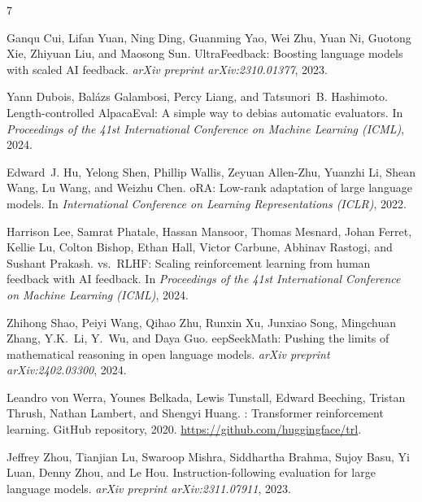 \documentclass{article}
\begin{document}
\begin{thebibliography}{7}

Ganqu Cui, Lifan Yuan, Ning Ding, Guanming Yao, Wei Zhu, Yuan Ni, Guotong Xie, Zhiyuan Liu, and Maosong Sun.
\newblock Ultra{F}eedback: Boosting language models with scaled {AI} feedback.
\newblock \emph{arXiv preprint arXiv:2310.01377}, 2023.

Yann Dubois, Bal\'{a}zs Galambosi, Percy Liang, and Tatsunori~B. Hashimoto.
\newblock Length-controlled {A}lpaca{E}val: A simple way to debias automatic evaluators.
\newblock In \emph{Proceedings of the 41st International Conference on Machine Learning (ICML)}, 2024.

Edward~J. Hu, Yelong Shen, Phillip Wallis, Zeyuan Allen-Zhu, Yuanzhi Li, Shean Wang, Lu Wang, and Weizhu Chen.
o{RA}: Low-rank adaptation of large language models.
\newblock In \emph{International Conference on Learning Representations (ICLR)}, 2022.

Harrison Lee, Samrat Phatale, Hassan Mansoor, Thomas Mesnard, Johan Ferret, Kellie Lu, Colton Bishop, Ethan Hall, Victor Carbune, Abhinav Rastogi, and Sushant Prakash.
 vs.\ {RLHF}: Scaling reinforcement learning from human feedback with {AI} feedback.
\newblock In \emph{Proceedings of the 41st International Conference on Machine Learning (ICML)}, 2024.

Zhihong Shao, Peiyi Wang, Qihao Zhu, Runxin Xu, Junxiao Song, Mingchuan Zhang, Y.K.~Li, Y.~Wu, and Daya Guo.
eep{S}eek{M}ath: Pushing the limits of mathematical reasoning in open language models.
\newblock \emph{arXiv preprint arXiv:2402.03300}, 2024.

Leandro von Werra, Younes Belkada, Lewis Tunstall, Edward Beeching, Tristan Thrush, Nathan Lambert, and Shengyi Huang.
: Transformer reinforcement learning.
\newblock GitHub repository, 2020.
\newblock \url{https://github.com/huggingface/trl}.

Jeffrey Zhou, Tianjian Lu, Swaroop Mishra, Siddhartha Brahma, Sujoy Basu, Yi Luan, Denny Zhou, and Le Hou.
\newblock Instruction-following evaluation for large language models.
\newblock \emph{arXiv preprint arXiv:2311.07911}, 2023.

\end{thebibliography}
\end{document}
